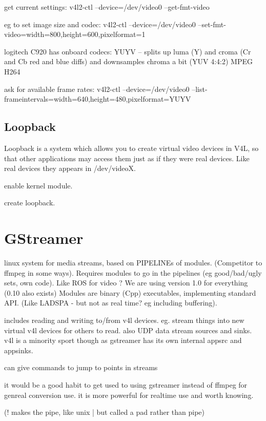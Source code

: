 \documentclass[oneside,english]{scrbook}
\begin{document}
get current settings: v4l2-ctl --device=/dev/video0 --get-fmt-video

eg to set image size and codec: v4l2-ctl --device=/dev/video0 --set-fmt-video=width=800,height=600,pixelformat=1

logitech C920 has onboard codecs: YUYV -- splits up luma (Y) and croma
(Cr and Cb red and blue diffs) and downsamples chroma a bit (YUV 4:4:2)
MPEG H264

ask for available frame rates: v4l2-ctl --device=/dev/video0 --list-frameintervals=width=640,height=480,pixelformat=YUYV


\section{Loopback}

Loopback is a system which allows you to create virtual video devices
in V4L, so that other applications may access them just as if they
were real devices. Like real devices they appears in /dev/videoX.

enable kernel module.

create loopback.




\chapter{GStreamer}

linux system for media streams, based on PIPELINEs of modules. (Competitor
to ffmpeg in some ways). Requires modules to go in the pipelines (eg
good/bad/ugly sets, own code). Like \textquotedbl{}ROS for video\textquotedbl{}
? We are using version 1.0 for everything (0.10 also exists) Modules
are binary (Cpp) executables, implementing standard API. (Like LADSPA
- but not as real time? eg including buffering).

includes reading and writing to/from v4l devices. eg. stream things
into new virtual v4l devices for others to read. also UDP data stream
sources and sinks. v4l is a minority sport though as gstreamer has
its own internal appsrc and appsinks.

can give commands to jump to points in streams

it would be a good habit to get used to using gstreamer instead of
ffmpeg for genreal conversion use. it is more powerful for realtime
use and worth knowing.

(\textquotedbl{}!\textquotedbl{} makes the pipe, like unix \textquotedbl{}|\textquotedbl{}
but called a \textquotedbl{}pad\textquotedbl{} rather than \textquotedbl{}pipe\textquotedbl{})
\end{document}

